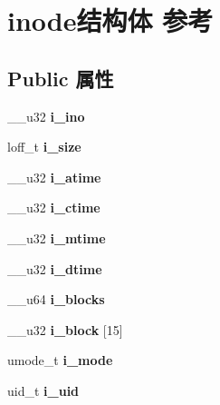 \hypertarget{structinode}{}\section{inode结构体 参考}
\label{structinode}
\subsection*{Public 属性}
\begin{DoxyCompactItemize}
\item 
\mbox{\label{structinode_a30456694bd29b9d7e8f800acb897bde5}} 
\+\_\+\+\_\+u32 {\bfseries i\+\_\+ino}
\item 
\mbox{\label{structinode_a59fab1ed5859adf6c4f603eb3359d6bd}} 
loff\+\_\+t {\bfseries i\+\_\+size}
\item 
\mbox{\label{structinode_aa3f89b660f9079b372730c0b3e67e089}} 
\+\_\+\+\_\+u32 {\bfseries i\+\_\+atime}
\item 
\mbox{\label{structinode_ab787a6d5347ab9b43fedbf51348ef127}} 
\+\_\+\+\_\+u32 {\bfseries i\+\_\+ctime}
\item 
\mbox{\label{structinode_a3a1ee49a3848fe74a8f2a2031aafb775}} 
\+\_\+\+\_\+u32 {\bfseries i\+\_\+mtime}
\item 
\mbox{\label{structinode_a22158e5493773845b4dfec777d40731d}} 
\+\_\+\+\_\+u32 {\bfseries i\+\_\+dtime}
\item 
\mbox{\label{structinode_a08555e74b86fa289f02d2e50b6944b1f}} 
\+\_\+\+\_\+u64 {\bfseries i\+\_\+blocks}
\item 
\mbox{\label{structinode_a209c61ec7431becd6b0a07705d1aca02}} 
\+\_\+\+\_\+u32 {\bfseries i\+\_\+block} \mbox{[}15\mbox{]}
\item 
\mbox{\label{structinode_a70f5495c9469e4af4c8d0fb8a4c0ba9a}} 
umode\+\_\+t {\bfseries i\+\_\+mode}
\item 
\mbox{\label{structinode_a9661c7379438c25c6cc91c3239f54a85}} 
uid\+\_\+t {\bfseries i\+\_\+uid}

\end{DoxyCompactItemize}
